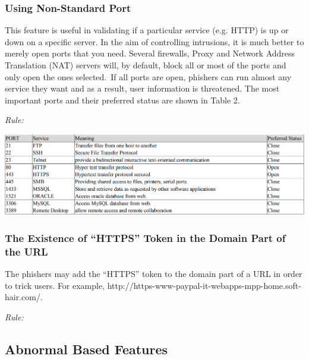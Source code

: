 \documentclass[twocolumn,10pt]{article}
\begin{document}
\subsubsection{Using Non-Standard Port}

This feature is useful in validating if a particular service (e.g. HTTP) is up or down on a specific server. In the aim of controlling intrusions, it is much better to merely open ports that you need. Several firewalls, Proxy and Network Address Translation (NAT) servers will, by default, block all or most of the ports and only open the ones selected. If all ports are open, phishers can run almost any service they want and as a result, user information is threatened. The most important ports and their preferred status are shown in Table 2. 
\begin{center}
\it Rule:
\end{center}
\begin{center}
\includegraphics[scale=0.15]{port}
\end{center}
\subsubsection{The Existence of “HTTPS” Token in the Domain Part of the URL}

The phishers may add the “HTTPS” token to the domain part of a URL in order to trick users. For example,
http://https-www-paypal-it-webapps-mpp-home.soft-hair.com/.
\begin{center}
\it Rule:
\end{center}
\subsection{Abnormal Based Features}
\end{document}

